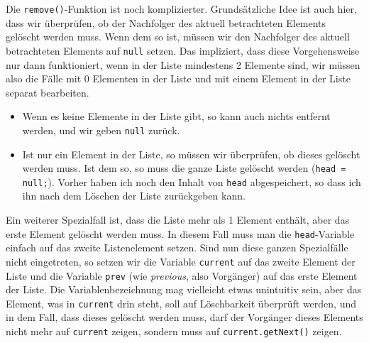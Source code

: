 \documentclass{article}
\begin{document}
	Die \texttt{remove()}-Funktion ist noch komplizierter. Grundsätzliche Idee ist auch hier, dass wir überprüfen, ob der Nachfolger des aktuell betrachteten Elements gelöscht werden muss. Wenn dem so ist, müssen wir den Nachfolger des aktuell betrachteten Elements auf \texttt{null} setzen. Das impliziert, dass diese Vorgehensweise nur dann funktioniert, wenn in der Liste mindestens 2 Elemente sind, wir müssen also die Fälle mit 0 Elementen in der Liste und mit einem Element in der Liste separat bearbeiten.
	\begin{itemize}
		\item Wenn es keine Elemente in der Liste gibt, so kann auch nichts entfernt werden, und wir geben \texttt{null} zurück.
		\item Ist nur ein Element in der Liste, so müssen wir überprüfen, ob dieses gelöscht werden muss. Ist dem so, so muss die ganze Liste gelöscht werden (\texttt{head = null;}). Vorher haben ich noch den Inhalt von \texttt{head} abgespeichert, so dass ich ihn nach dem Löschen der Liste zurückgeben kann.
	\end{itemize}
	Ein weiterer Spezialfall ist, dass die Liste mehr als 1 Element enthält, aber das erste Element gelöscht werden muss. In diesem Fall muss man die \texttt{head}-Variable einfach auf das zweite Listenelement setzen. Sind nun diese ganzen Spezialfälle nicht eingetreten, so setzen wir die Variable \texttt{current} auf das zweite Element der Liste und die Variable \texttt{prev} (wie \textit{previous}, also Vorgänger) auf das erste Element der Liste. Die Variablenbezeichnung mag vielleicht etwas unintuitiv sein, aber das Element, was in \texttt{current} drin steht, soll auf Löschbarkeit überprüft werden, und in dem Fall, dass dieses gelöscht werden muss, darf der Vorgänger dieses Elements nicht mehr auf \texttt{current} zeigen, sondern muss auf \texttt{current.getNext()} zeigen.
	\begin{center}
	\end{center}
\end{document}
